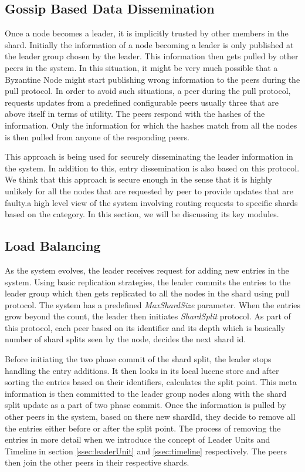 \documentclass[12pt,a4paper,twoside,openright]{book}
\begin{document}
\subsection{Gossip Based Data Dissemination}
\label{ssec:gossip}
Once a node becomes a leader, it is implicitly trusted by other members in the shard. Initially the information of a node becoming a leader is only published at the leader group chosen by the leader. This information then gets pulled by other peers in the system. In this situation, it might be very much possible that a Byzantine Node might start publishing wrong information to the peers during the pull protocol. In order to avoid such situations, a peer during the pull protocol, requests updates from a predefined configurable peers usually three that are above itself in terms of utility.  The peers respond with the hashes of the information. Only the information for which the hashes match from all the nodes is then pulled from anyone of the responding peers. 
\par This approach is being used for securely disseminating the leader information in the system. In addition to this, entry dissemination is also based on this protocol. We think that this approach is secure enough in the sense that it is highly unlikely for all the nodes that are requested by peer to provide updates that are faulty.a high level view of the system involving routing requests to specific shards based on the category. In this section, we will be discussing its key modules.


\subsection{Load Balancing}
\label{ssec:loadBalance}
As the system evolves, the leader receives request for adding new entries in the system. Using basic replication strategies, the leader commits the entries to the leader group which then gets replicated to all the nodes in the shard using pull protocol. The system has a predefined \textit{MaxShardSize} parameter. When the entries grow beyond the count, the leader then initiates \textit{ShardSplit} protocol. As part of this protocol, each peer based on its identifier and its depth which is basically number of shard splits seen by the node, decides the next shard id. 
\par Before initiating the two phase commit of the shard split, the leader stops handling the entry additions. It then looks in its local lucene store and after sorting the entries based on their identifiers, calculates the split point. This meta information is then committed to the leader group nodes along with the shard split update as a part of two phase commit. Once the information is pulled by other peers in the system, based on there new shardId, they decide to remove all the entries either before or after the split point. The process of removing the entries in more detail when we introduce the concept of Leader Units and Timeline in section \ref{ssec:leaderUnit} and \ref{ssec:timeline} respectively. The peers then join the other peers in their respective shards. 
\end{document}
